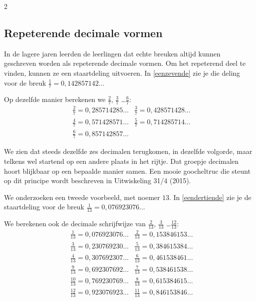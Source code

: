 \begin{multicols}{2}
	\subsection{Repeterende decimale vormen}
	
	In de lagere jaren leerden de leerlingen dat echte breuken altijd kunnen geschreven worden als repeterende decimale vormen. Om het repeterend deel te vinden, kunnen ze een staartdeling uitvoeren. 
	In \autoref{eenzevende} zie je die deling voor de breuk $\frac{1}{7}=0,142857142\ldots$ 
	
	
	Op dezelfde manier berekenen we $\frac{2}{7}$, $\frac{3}{7}$ \ldots $\frac{6}{7}$:  
	\begin{align*}
		&\frac{2}{7}=0,285714285\ldots
		&\frac{3}{7}=0,428571428\ldots\\
		&\frac{4}{7}=0,571428571\ldots
		&\frac{5}{7}=0,714285714\ldots\\
		&\frac{6}{7}=0,857142857\ldots
	\end{align*}
	
	We zien dat steeds dezelfde zes decimalen terugkomen, in dezelfde volgorde, maar telkens wel startend op een andere plaats in het rijtje. Dat groepje decimalen hoort blijkbaar op een bepaalde manier samen. Een mooie goocheltruc die steunt op dit principe wordt beschreven in Uitwiskeling 31/4 (2015).
	
	We onderzoeken een tweede voorbeeld, met noemer $13$. %
	In \autoref{eendertiende} zie je de staartdeling voor de breuk $\frac{1}{13}=0,076923076\ldots$
	
	We berekenen ook de decimale schrijfwijze van $\frac{2}{13}$, $\frac{3}{13}$ \ldots $\frac{12}{13}$:
			\begin{align*}
		&\frac{1}{13}=0,076923076\ldots
		&\frac{2}{13}=0,153846153\ldots\\
		&\frac{3}{13}=0,230769230\ldots
		&\frac{5}{13}=0,384615384\ldots\\
		&\frac{4}{13}=0,307692307\ldots
		&\frac{6}{13}=0,461538461\ldots\\
		&\frac{9}{13}=0,692307692\ldots
		&\frac{7}{13}=0,538461538\ldots\\
		&\frac{10}{13}=0,769230769\ldots
		&\frac{8}{13}=0,615384615\ldots\\
		&\frac{12}{13}=0,923076923\ldots
		&\frac{11}{13}=0,846153846\ldots
	\end{align*}
	

\end{multicols}
